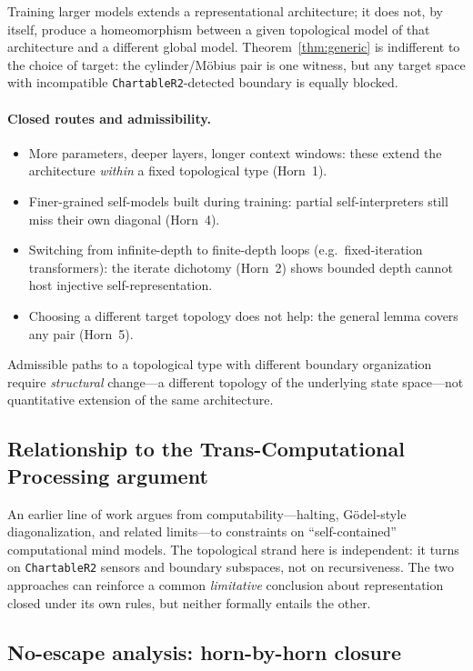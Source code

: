 \documentclass[11pt]{article}
\begin{document}
Training larger models extends a representational architecture; it does not, by
itself, produce a homeomorphism between a given topological model of that
architecture and a different global model.  Theorem~\ref{thm:generic} is
indifferent to the choice of target: the cylinder/M\"obius pair is one
witness, but any target space with incompatible
\texttt{ChartableR2}-detected boundary is equally blocked.

\paragraph{Closed routes and admissibility.}
\begin{itemize}[leftmargin=1.5em,itemsep=0pt,topsep=0.3ex,parsep=0pt]
\item More parameters, deeper layers, longer context windows: these
  extend the architecture \emph{within} a fixed topological type (Horn~1).
\item Finer-grained self-models built during training: partial
  self-interpreters still miss their own diagonal (Horn~4).
\item Switching from infinite-depth to finite-depth loops (e.g.\
  fixed-iteration transformers): the iterate dichotomy (Horn~2) shows
  bounded depth cannot host injective self-representation.
\item Choosing a different target topology does not help: the general
  lemma covers any pair (Horn~5).
\end{itemize}
Admissible paths to a topological type with different boundary
organization require \emph{structural} change---a different topology
of the underlying state space---not quantitative extension of the same
architecture.

\subsection{Relationship to the Trans-Computational Processing argument}

An earlier line of work argues from computability---halting,
G\"odel-style diagonalization, and related limits---to constraints on
``self-contained'' computational mind models. The topological strand here is
independent: it turns on \texttt{ChartableR2} sensors and boundary
subspaces, not on recursiveness. The two approaches can reinforce a common
\emph{limitative} conclusion about representation closed under its own rules,
but neither formally entails the other.

\subsection{No-escape analysis: horn-by-horn closure}
\label{sec:noescape}
\end{document}
